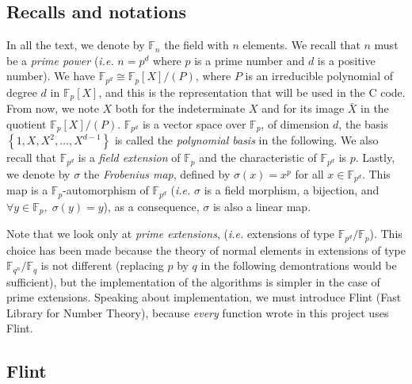 \documentclass[a4paper,11pt]{article}
\theoremstyle{break}
\theoremstyle{sc}
\theoremstyle{definition}
\theoremstyle{remark}
\newcommand{\ie}{\emph{i.e. }}
\begin{document}
\subsection{Recalls and notations}
In all the text, we denote by $\mathbb{F}_n$ the field with $n$ elements. We
recall that $n$ must be a \emph{prime power} (\ie $n=p^d$ where $p$ is a prime
number and $d$ is a positive number). We have
$\mathbb{F}_{p^d}\cong\mathbb{F}_p[X]/(P)$, where $P$ is an irreducible
polynomial of degree $d$ in $\mathbb{F}_p[X]$, and this is the representation
that will be used in the C code. From now, we note
$X$ both for the indeterminate $X$ and for its image $\bar X$ in the
quotient $\mathbb{F}_p[X]/(P)$. $\mathbb{F}_{p^d}$ is a vector space over
$\mathbb{F}_p$, of dimension $d$, the basis $\left\{ 1, X, X^2, \dots, 
X^{d-1} \right\}$ is called the \emph{polynomial basis} in the following. We also recall
that $\mathbb{F}_{p^d}$ is a \emph{field extension} of $\mathbb{F}_p$ and the
characteristic of $\mathbb{F}_{p^d}$ is $p$. Lastly, we denote by $\sigma$ the
\emph{Frobenius map}, defined by $\sigma(x)=x^p$ for all
$x\in\mathbb{F}_{p^d}$. This map is a $\mathbb{F}_p$-automorphism of
$\mathbb{F}_{p^d}$ (\ie $\sigma$ is a field morphism, a bijection, and $\forall
y\in\mathbb{F}_p,\;\sigma(y)=y$), as a consequence, $\sigma$ is also a linear
map.

Note that we look only
at \emph{prime extensions}, (\ie extensions of type
$\mathbb{F}_{p^d}/\mathbb{F}_p$). This choice has been made because the theory
of normal elements in extensions of type $\mathbb{F}_{q^n}/\mathbb{F}_q$ is not
different (replacing $p$ by $q$ in the following demontrations would be
sufficient), but the implementation of the algorithms is simpler in the case of
prime extensions. Speaking about implementation, we must introduce Flint
(Fast Library for Number Theory), because \emph{every} function wrote in this
project uses Flint.

\subsection{Flint}
\end{document}

